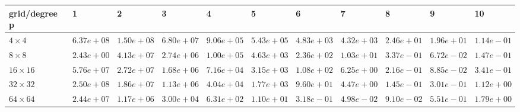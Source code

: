 \begin{tabular}{lllllllllll}
\hline
 grid/degree p   & 1          & 2          & 3          & 4          & 5          & 6          & 7          & 8          & 9          & 10         \\
\hline
 $4 \times 4$    & $6.37e+08$ & $1.50e+08$ & $6.80e+07$ & $9.06e+05$ & $5.43e+05$ & $4.83e+03$ & $4.32e+03$ & $2.46e+01$ & $1.96e+01$ & $1.14e-01$ \\
 $8 \times 8$    & $2.43e+00$ & $4.13e+07$ & $2.74e+06$ & $1.00e+05$ & $4.63e+03$ & $2.36e+02$ & $1.03e+01$ & $3.37e-01$ & $6.72e-02$ & $1.47e-01$ \\
 $16 \times 16$  & $5.76e+07$ & $2.72e+07$ & $1.68e+06$ & $7.16e+04$ & $3.15e+03$ & $1.08e+02$ & $6.25e+00$ & $2.16e-01$ & $8.85e-02$ & $3.41e-01$ \\
 $32 \times 32$  & $2.50e+08$ & $1.86e+07$ & $1.13e+06$ & $4.04e+04$ & $1.77e+03$ & $9.60e+01$ & $4.47e+00$ & $1.45e-01$ & $3.01e-01$ & $1.12e+00$ \\
 $64 \times 64$  & $2.44e+07$ & $1.17e+06$ & $3.00e+04$ & $6.31e+02$ & $1.10e+01$ & $3.18e-01$ & $4.98e-02$ & $9.10e-02$ & $5.51e-01$ & $1.79e+00$ \\
\hline
\end{tabular}